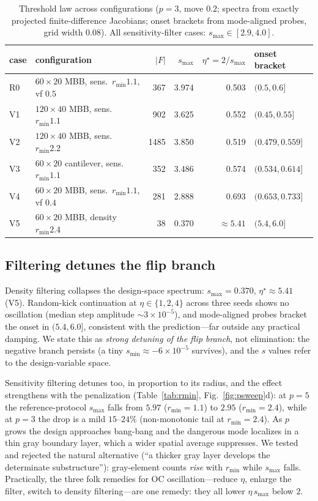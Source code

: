 \documentclass[11pt,a4paper]{article}
\newcommand{\smax}{s_{\max}}
\newcommand{\smin}{s_{\min}}
\newcommand{\etastar}{\eta^{\star}}
\begin{document}
\begin{table}[t]
\centering\small
\caption{Threshold law across configurations ($p=3$, move $0.2$; spectra
from exactly projected finite-difference Jacobians; onset brackets from
mode-aligned probes, grid width $0.08$). All sensitivity-filter cases:
$\smax\in[2.9,4.0]$.}
\label{tab:robust}
\begin{tabular}{llrrrl}
\toprule
case & configuration & $|F|$ & $\smax$ & $\etastar=2/\smax$ & onset bracket \\
\midrule
R0 & $60{\times}20$ MBB, sens.\ $r_{\min}1.1$, vf $0.5$ & 367 & 3.974 & 0.503 & $(0.5,0.6]$ \\
V1 & $120{\times}40$ MBB, sens.\ $r_{\min}1.1$          & 902 & 3.625 & 0.552 & $(0.45,0.55]$ \\
V2 & $120{\times}40$ MBB, sens.\ $r_{\min}2.2$          & 1485 & 3.850 & 0.519 & $(0.479,0.559]$ \\
V3 & $60{\times}20$ cantilever, sens.\ $r_{\min}1.1$    & 352 & 3.486 & 0.574 & $(0.534,0.614]$ \\
V4 & $60{\times}20$ MBB, sens.\ $r_{\min}1.1$, vf $0.4$ & 281 & 2.888 & 0.693 & $(0.653,0.733]$ \\
V5 & $60{\times}20$ MBB, density $r_{\min}2.4$          & 38  & 0.370 & $\approx5.41$ & $(5.4,6.0]$ \\
\bottomrule
\end{tabular}
\end{table}

\subsection{Filtering detunes the flip branch}\label{sec:filters}

Density filtering collapses the design-space spectrum: $\smax=0.370$,
$\etastar\approx5.41$ (V5). Random-kick continuation at
$\eta\in\{1,2,4\}$ across three seeds shows no oscillation (median step
amplitude $\sim3\times10^{-5}$), and mode-aligned probes bracket the
onset in $(5.4,6.0]$, consistent with the prediction---far outside any
practical damping. We state this as \emph{strong detuning of the flip
branch}, not elimination: the negative branch persists (a tiny
$\smin\approx-6\times10^{-5}$ survives), and the $s$ values refer to the
design-variable space.

Sensitivity filtering detunes too, in proportion to its radius, and the
effect strengthens with the penalization (Table~\ref{tab:rmin},
Fig.~\ref{fig:psweep}d): at $p=5$
the reference-protocol $\smax$ falls from $5.97$ ($r_{\min}=1.1$) to
$2.95$ ($r_{\min}=2.4$), while at $p=3$ the drop is a mild
$15$--$24\%$ (non-monotonic tail at $r_{\min}=2.4$). As $p$ grows the
design approaches bang-bang and the dangerous mode localizes in a thin
gray boundary layer, which a wider spatial average suppresses. We tested
and rejected the natural alternative (``a thicker gray layer develops the
determinate substructure''): gray-element counts \emph{rise} with
$r_{\min}$ while $\smax$ falls. Practically, the three folk remedies for
OC oscillation---reduce $\eta$, enlarge the filter, switch to density
filtering---are one remedy: they all lower $\eta\,\smax$ below $2$.
\end{document}
